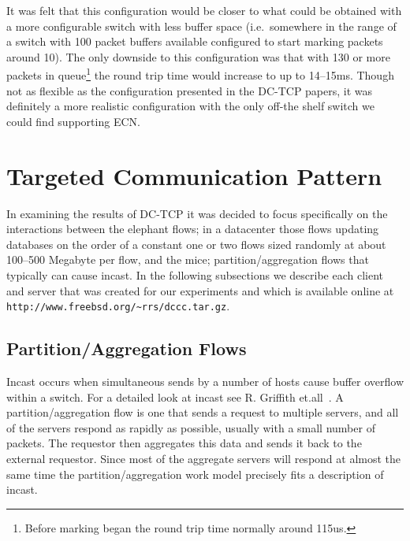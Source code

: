 \documentclass[12pt]{article}
\begin{document}
 It was felt that this configuration would be closer to what could be obtained with a more
 configurable switch with less buffer space (i.e.~somewhere in the range of a switch with
 100 packet buffers available configured to start marking packets around 10).  The only downside
 to this configuration was that with 130 or more packets in queue\footnote{Before marking began the
 round trip time normally around 115us.} the round trip time would increase to up to 14--15ms.
 Though not as flexible as the configuration presented in the DC-TCP papers, it was definitely a more realistic configuration with the only
 off-the shelf  switch we could find supporting ECN.
 
\section{Targeted Communication Pattern}
In examining the results of DC-TCP it was decided to focus specifically on the interactions between
the elephant flows; in a datacenter those flows updating databases on the order of a constant one or two flows
sized randomly at about 100--500 Megabyte per flow, and the mice; partition/aggregation flows that typically 
can cause incast. In the following subsections we describe each client and server that was created for
our experiments and which is available online at \texttt{http://www.freebsd.org/\textasciitilde rrs/dccc.tar.gz}.

\subsection{Partition/Aggregation Flows}
\label{partition}

Incast occurs when simultaneous sends by a number of hosts cause buffer overflow within
a switch. For a detailed look at incast see R. Griffith et.all~\cite{griffen}. A
partition/aggregation flow is one that sends a request to multiple servers, and all of the servers respond
as rapidly as possible, usually with a small number of packets. The requestor then aggregates
this data and sends it back to the external requestor. Since most of the aggregate servers will respond
at almost the same time the partition/aggregation work model precisely fits a description of incast. 
\end{document}
